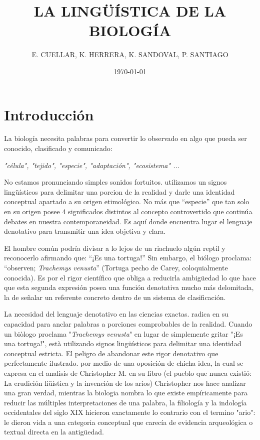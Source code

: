 \documentclass[12pt]{article}
\title{LA LINGÜÍSTICA DE LA BIOLOGÍA}
\author{E. CUELLAR, K. HERRERA, K. SANDOVAL, P. SANTIAGO}
\date{\today}
\begin{document}
\maketitle

\section{Introducción}
La biología necesita palabras para convertir lo observado en algo que pueda ser conocido, clasificado y comunicado: 

\textit{"célula", "tejido", "especie", "adaptación", "ecosistema" ...}

No estamos pronunciando simples sonidos fortuitos. utilizamos un signos lingüísticos para delimitar una porcion de la realidad y darle una identidad conceptual apartado a su origen etimológico.
No más que “especie” que tan solo en su origen posee 4 significados distintos al concepto controvertido que continúa debates en nuestra contemporaneidad. Es aquí donde encuentra lugar el lenguaje denotativo para transmitir una idea objetiva y clara.  

El hombre común podría divisar a lo lejos de un riachuelo algún reptil y reconocerlo afirmando que:  “¡Es una tortuga!” Sin embargo, el biólogo proclama:  “observen; \textit{Trachemys venusta}” (Tortuga pecho de Carey, coloquialmente conocida). Es por el rigor científico que obliga a reducirla ambigüedad lo que hace que esta segunda expresión posea una función denotativa mucho más delomitada, la de señalar un referente concreto dentro de un sistema de clasificación.

La necesidad del lenguaje denotativo en las ciencias exactas. radica en su capacidad para anclar palabras a porciones comprobables de la realidad. Cuando un biòlogo proclama "\textit{Trachemys venusta}" en lugar de simplemente gritar "¡Es una tortuga!", està utilizando signos lingüísticos para delimitar una identidad conceptual estricta. El peligro de abandonar este rigor denotativo que perfectamente ilustrado. por medio de una oposición de chicha idea, la cual se expresa en el analisis de Christopher M. en su libro (el pueblo que nunca existió: La erudición liüística y la invención de los arios) Christopher nos hace analizar una gran verdad, mientras la biologia nombra lo que existe empíricamente para reducir las múltiples interpretaciones de una palabra, la filiología y la indología occidentales del siglo XIX hicieron exactamente lo contrario con el termino "ario": le dieron vida a una categoria conceptual que carecía de evidencia arqueológica o textual directa en la antigüedad.
\end{document}
